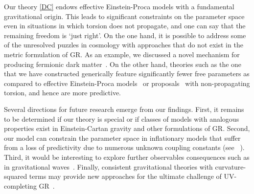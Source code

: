 \documentclass[aps,prd,reprint,preprintnumbers,showpacs,floatfix,nofootinbib,superscript address,longbibliography]{revtex4-1}
\begin{document}
Our theory \eqref{DC} endows effective Einstein-Proca models with a fundamental gravitational origin. This leads to significant constraints on the parameter space even in situations in which torsion does not propagate, and one can say that the remaining freedom is `just right'. On the one hand, it is possible to address some of the unresolved puzzles in cosmology with approaches that do not exist in the metric formulation of GR. As an example, we discussed a novel mechanism for producing fermionic dark matter~\cite{Shaposhnikov:2020aen}. On the other hand, theories such as the one that we have constructed generically feature significantly fewer free parameters as compared to effective Einstein-Proca models~\cite{Ford:1989me,Golovnev:2008cf,Chiba:2008eh,Koivisto:2008xf,Kanno:2008gn,Emami:2016ldl,Armendariz-Picon:2004say,Koivisto:2007bp,Koivisto:2008xf,Tasinato:2014eka,DeFelice:2016yws,DeFelice:2016uil,BeltranJimenez:2016afo,deFelice:2017paw,Nakamura:2018oyy,Heisenberg:2020xak,Benisty:2021sul,deRham:2021efp,Hambye:2008bq,Hambye:2009fg,Arina:2009uq,Hisano:2010yh,Diaz-Cruz:2010czr,Lebedev:2011iq,Farzan:2012hh,Baek:2012se,Arcadi:2020jqf,Barman:2021qds,Bekenstein:1971hc,Heisenberg:2017hwb,Garcia-Saenz:2021uyv} or proposals~\cite{Freidel:2005sn,Bauer:2008zj,Poplawski:2011xf,Diakonov:2011fs,Khriplovich:2012xg,Magueijo:2012ug,Khriplovich:2013tqa,Markkanen:2017tun,Carrilho:2018ffi,Enckell:2018hmo,Rasanen:2018fom,Rubio:2019ypq,Shaposhnikov:2020geh,Karananas:2020qkp,Langvik:2020nrs,Shaposhnikov:2020gts,Mikura:2020qhc,Shaposhnikov:2020aen,Kubota:2020ehu,Enckell:2020lvn,Iosifidis:2021iuw,Racioppi:2021ynx,Cheong:2021kyc,Dioguardi:2021fmr,Piani:2022gon,Dux:2022kuk,Rasanen:2022ijc,Gialamas:2023emn,Gialamas:2023flv,Piani:2023aof,Poisson:2023tja,Rigouzzo:2023sbb} with non-propagating torsion, and hence are more predictive.



Several directions for future research emerge from our findings. First, it remains to be determined if our theory is special or if classes of models with analogous properties exist in Einstein-Cartan gravity and other formulations of GR. Second, our model can constrain the parameter space in inflationary models that suffer from a loss of predictivity due to numerous unknown coupling constants (see \eg~\cite{Bauer:2008zj,Rasanen:2018ihz, Raatikainen:2019qey, Langvik:2020nrs, Shaposhnikov:2020gts,Rigouzzo:2022yan}). Third, it would be interesting to explore further observables consequences such as in gravitational waves~\cite{Battista:2021rlh}. Finally, consistent gravitational theories with curvature-squared terms may provide new approaches for the ultimate challenge of UV-completing GR~\cite{Lin:2019ugq}.
\end{document}

